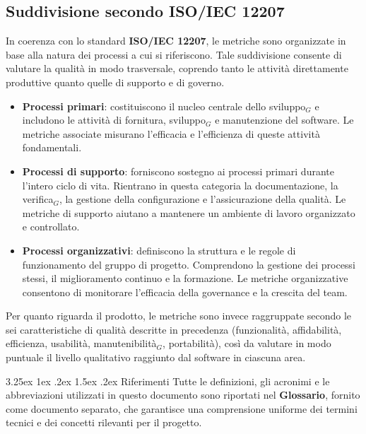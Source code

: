 \documentclass[a4paper, 10pt]{article}
\makeatletter
\renewcommand\paragraph{\@startsection{paragraph}{4}{\z@}%
  {3.25ex \@plus1ex \@minus .2ex}%
  {1.5ex \@plus .2ex}%
  {\normalfont\normalsize\bfseries}}
\makeatother
\begin{document}
\subsection{Suddivisione secondo ISO/IEC 12207}

In coerenza con lo standard \textbf{ISO/IEC 12207}, le metriche sono organizzate in base alla natura dei processi a cui si riferiscono. Tale suddivisione consente di valutare la qualità in modo trasversale, coprendo tanto le attività direttamente produttive quanto quelle di supporto e di governo.

\begin{itemize}
    \item \textbf{Processi primari}: costituiscono il nucleo centrale dello sviluppo$_G$ e includono le attività di fornitura, sviluppo$_G$ e manutenzione del software. Le metriche associate misurano l'efficacia e l'efficienza di queste attività fondamentali.
    \item \textbf{Processi di supporto}: forniscono sostegno ai processi primari durante l'intero ciclo di vita. Rientrano in questa categoria la documentazione, la verifica$_G$, la gestione della configurazione e l'assicurazione della qualità. Le metriche di supporto aiutano a mantenere un ambiente di lavoro organizzato e controllato.
    \item \textbf{Processi organizzativi}: definiscono la struttura e le regole di funzionamento del gruppo di progetto. Comprendono la gestione dei processi stessi, il miglioramento continuo e la formazione. Le metriche organizzative consentono di monitorare l'efficacia della governance e la crescita del team.
\end{itemize}

Per quanto riguarda il prodotto, le metriche sono invece raggruppate secondo le sei caratteristiche di qualità descritte in precedenza (funzionalità, affidabilità, efficienza, usabilità, manutenibilità$_G$, portabilità), così da valutare in modo puntuale il livello qualitativo raggiunto dal software in ciascuna area.

\paragraph{Riferimenti}
Tutte le definizioni, gli acronimi e le abbreviazioni utilizzati in questo documento sono riportati nel \textbf{Glossario}, fornito come documento separato, che garantisce una comprensione uniforme dei termini tecnici e dei concetti rilevanti per il progetto.
\end{document}
